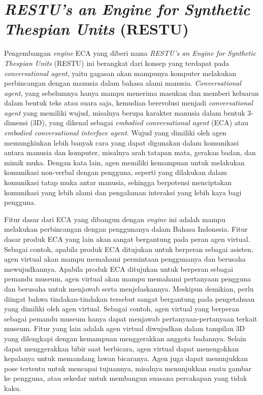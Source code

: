
\section{\textit{RESTU's an Engine for Synthetic Thespian Units} (RESTU)}
\label{sec:RESTU}

Pengembangan \textit{engine} ECA yang diberi nama \textit{RESTU's an Engine for Synthetic Thespian Units} (RESTU) ini berangkat dari konsep yang terdapat pada \textit{conversational agent}, yaitu gagasan akan mampunya komputer melakukan perbincangan dengan manusia dalam bahasa alami manusia. \textit{Conversational agent}, yang sebelumnya hanya mampu menerima masukan dan memberi keluaran dalam bentuk teks atau suara saja, kemudian berevolusi menjadi \textit{conversational agent} yang memiliki wujud, misalnya berupa karakter manusia dalam bentuk 3-dimensi (3D), yang dikenal sebagai \textit{embodied conversational agent} (ECA) atau \textit{embodied conversational interface agent}. Wujud yang dimiliki oleh agen memungkinkan lebih banyak cara yang dapat digunakan dalam komunikasi antara manusia dan komputer, misalnya arah tatapan mata, gerakan badan, dan mimik muka. Dengan kata lain, agen memiliki kemampuan untuk melakukan komunikasi non-verbal dengan pengguna, seperti yang dilakukan dalam komunikasi tatap muka antar manusia, sehingga berpotensi menciptakan komunikasi yang lebih alami dan pengalaman interaksi yang lebih kaya bagi pengguna.

Fitur dasar dari ECA yang dibangun dengan \textit{engine} ini adalah mampu melakukan perbincangan dengan penggunanya dalam Bahasa Indonesia. Fitur dasar produk ECA yang lain akan sangat bergantung pada peran agen virtual. Sebagai contoh, apabila produk ECA ditujukan untuk berperan sebagai asisten, agen virtual akan mampu memahami permintaan penggunanya dan berusaha mewujudkannya. Apabila produk ECA ditujukan untuk berperan sebagai pemandu museum, agen virtual akan mampu memahami pertanyaan pengguna dan berusaha untuk menjawab serta menjelaskannya. Meskipun demikian, perlu diingat bahwa tindakan-tindakan tersebut sangat bergantung pada pengetahuan yang dimiliki oleh agen virtual. Sebagai contoh, agen virtual yang berperan sebagai pemandu museum hanya dapat menjawab pertanyaan-pertanyaan terkait museum. Fitur yang lain adalah agen virtual diwujudkan dalam tampilan 3D yang dilengkapi dengan kemampuan menggerakkan anggota badannya. Selain dapat menggerakkan bibir saat berbicara, agen virtual dapat menengokkan kepalanya untuk memandang lawan bicaranya. Agen juga dapat menunjukkan pose tertentu untuk mencapai tujuannya, misalnya menunjukkan suatu gambar ke pengguna, atau sekedar untuk membangun suasana percakapan yang tidak kaku.

